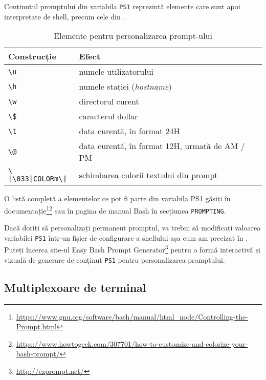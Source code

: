 Conținutul promptului din variabila \texttt{PS1} reprezintă elemente care sunt apoi interpretate de shell, precum cele din .

\begin{table}[!htb]
  \begin{center}
    \begin{tabular}{ p{} p{} }
      \toprule
        \textbf{Construcție} &
        \textbf{Efect} \\
      \midrule
        \verb|\u| &
        numele utilizatorului \\
      \midrule
        \verb|\h| &
        numele stației (\textit{hostname}) \\
      \midrule
        \verb|\w| &
        directorul curent \\
      \midrule
        \verb|\$| &
        caracterul dollar \\
      \midrule
        \verb|\t| &
        data curentă, în format 24H \\
      \midrule
        \verb|\@| &
        data curentă, în format 12H, urmată de AM / PM \\
      \midrule
        \verb|\[\033[COLORm\]| &
        schimbarea culorii textului din prompt \\
      \bottomrule
    \end{tabular}
  \end{center}
  \caption{Elemente pentru personalizarea prompt-ului}
  \label{tab:cli:prompt}
\end{table}

O listă completă a elementelor ce pot fi parte din variabila PS1 găsiți în documentație\footnote{\url{https://www.gnu.org/software/bash/manual/html_node/Controlling-the-Prompt.html}}\footnote{\url{https://www.howtogeek.com/307701/how-to-customize-and-colorize-your-bash-prompt/}} sau în pagina de manual Bash în secțiunea \texttt{PROMPTING}.

Dacă doriți să personalizați permanent promptul, va trebui să modificați valoarea variabilei \texttt{PS1} într-un fișier de configurare a shellului așa cum am precizat în .
Puteți încerca site-ul Easy Bash Prompt Generator\footnote{\url{http://ezprompt.net/}} pentru o formă interactivă și vizuală de generare de conținut \texttt{PS1} pentru personalizarea promptului.

\subsection{Multiplexoare de terminal}
\label{sec:cli:shell-start:mux}

